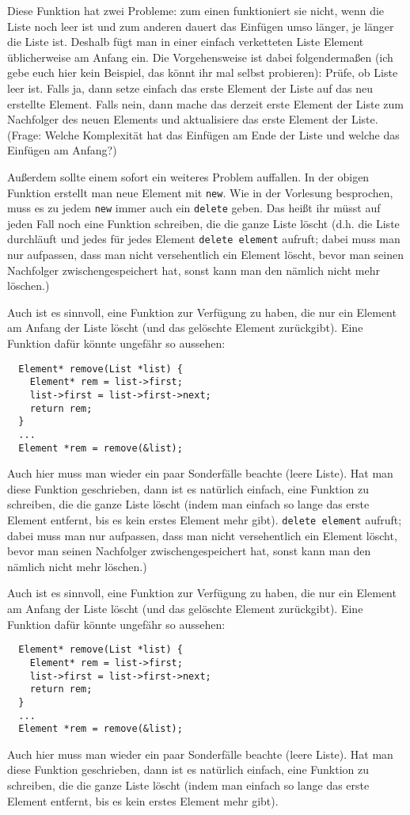 \documentclass[
fontsize = 11pt,
paper    = a4,
BCOR     = 5mm,
DIV      = 12,
numbers  = noenddot,
]{scrartcl}
\begin{document}
Diese Funktion hat zwei Probleme: zum einen funktioniert sie nicht,
wenn die Liste noch leer ist und zum anderen dauert das Einfügen umso
länger, je länger die Liste ist. Deshalb fügt man in einer einfach
verketteten Liste Element üblicherweise am Anfang ein. Die
Vorgehensweise ist dabei folgendermaßen (ich gebe euch hier kein
Beispiel, das könnt ihr mal selbst probieren): Prüfe, ob Liste leer
ist. Falls ja, dann setze einfach das erste Element der Liste auf das
neu erstellte Element. Falls nein, dann mache das derzeit erste
Element der Liste zum Nachfolger des neuen Elements und aktualisiere
das erste Element der Liste. (Frage: Welche Komplexität hat das
Einfügen am Ende der Liste und welche das Einfügen am Anfang?)

Außerdem sollte einem sofort ein weiteres Problem auffallen. In der
obigen Funktion erstellt man neue Element mit \lstinline{new}. Wie in
der Vorlesung besprochen, muss es zu jedem \lstinline{new} immer auch
ein \lstinline{delete} geben. Das heißt ihr müsst auf jeden Fall noch
eine Funktion schreiben, die die ganze Liste löscht (d.h. die Liste
durchläuft und jedes für jedes Element \lstinline{delete element}
aufruft; dabei muss man nur aufpassen, dass man nicht versehentlich
ein Element löscht, bevor man seinen Nachfolger zwischengespeichert
hat, sonst kann man den nämlich nicht mehr löschen.)

Auch ist es sinnvoll, eine Funktion zur Verfügung zu haben, die nur
ein Element am Anfang der Liste löscht (und das gelöschte Element
zurückgibt). Eine Funktion dafür könnte ungefähr so aussehen:
\begin{lstlisting}
  Element* remove(List *list) {
    Element* rem = list->first;
    list->first = list->first->next;
    return rem;
  }
  ...
  Element *rem = remove(&list);
\end{lstlisting}
Auch hier muss man wieder ein paar Sonderfälle beachte (leere Liste).
Hat man diese Funktion geschrieben, dann ist es natürlich einfach,
eine Funktion zu schreiben, die die ganze Liste löscht (indem man
einfach so lange das erste Element entfernt, bis es kein erstes
Element mehr gibt).
 \lstinline{delete element}
aufruft; dabei muss man nur aufpassen, dass man nicht versehentlich
ein Element löscht, bevor man seinen Nachfolger zwischengespeichert
hat, sonst kann man den nämlich nicht mehr löschen.)

Auch ist es sinnvoll, eine Funktion zur Verfügung zu haben, die nur
ein Element am Anfang der Liste löscht (und das gelöschte Element
zurückgibt). Eine Funktion dafür könnte ungefähr so aussehen:
\begin{lstlisting}
  Element* remove(List *list) {
    Element* rem = list->first;
    list->first = list->first->next;
    return rem;
  }
  ...
  Element *rem = remove(&list);
\end{lstlisting}
Auch hier muss man wieder ein paar Sonderfälle beachte (leere Liste).
Hat man diese Funktion geschrieben, dann ist es natürlich einfach,
eine Funktion zu schreiben, die die ganze Liste löscht (indem man
einfach so lange das erste Element entfernt, bis es kein erstes
Element mehr gibt).
\end{document}
